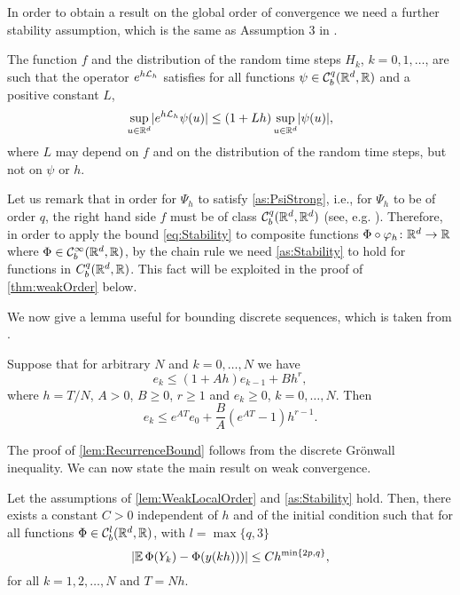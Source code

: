 \documentclass[10pt]{article}
\begin{document}
In order to obtain a result on the global order of convergence we need a further stability assumption, which is the same as Assumption 3 in \cite{CGS17}.
\begin{assumption}\label{as:Stability} The function $f$ and the distribution of the random time steps $H_k$, $k = 0, 1, \ldots$, are such that the operator $e^{h\mathcal{L}_h}$ satisfies for all functions $\psi\in \mathcal C^q_b(\mathbb{R}^d, \mathbb{R})$ and a positive constant $L$, 
	\begin{equation}\label{eq:Stability}
		\sup_{u\in\mathbb{R}^d} \lvert e^{h\mathcal{L}_h}\psi(u)\rvert \leq (1 + Lh)\sup_{u\in\mathbb{R}^d}\lvert\psi(u)\rvert,
	\end{equation}
	where $L$ may depend on $f$ and on the distribution of the random time steps, but not on $\psi$ or $h$.
\end{assumption}
\begin{remark} Let us remark that in order for $\Psi_h$ to satisfy \cref{as:PsiStrong}, i.e., for $\Psi_h$ to be of order $q$, the right hand side $f$ must be of class $\mathcal C_b^q(\mathbb{R}^d, \mathbb{R}^d)$ (see, e.g. \cite[Theorem II.3.1]{HNW93}). Therefore, in order to apply the bound \eqref{eq:Stability} to composite functions $\Phi \circ \varphi_h \colon \mathbb{R}^d \to \mathbb{R}$ where $\Phi \in \mathcal C^\infty_b(\mathbb{R}^d, \mathbb{R})$, by the chain rule we need \cref{as:Stability} to hold for functions in $C^q_b(\mathbb{R}^d, \mathbb{R})$. This fact will be exploited in the proof of \cref{thm:weakOrder} below.
\end{remark}
We now give a lemma useful for bounding discrete sequences, which is taken from \cite[Lemma 1.6]{MiT04}.
\begin{lemma}\label{lem:RecurrenceBound} Suppose that for arbitrary $N$ and $k = 0, \ldots, N$ we have
		\begin{equation}
		e_k \leq (1 + Ah) e_{k-1} + Bh^r,
		\end{equation}
		where $h = T / N$, $A > 0$, $B \geq 0$, $r \geq 1$ and $e_k \geq 0$, $k = 0, \ldots, N$. Then
		\begin{equation}
		e_k \leq e^{AT}e_0 + \frac{B}{A}(e^{AT} - 1) h^{r-1}.
		\end{equation}
\end{lemma}

The proof of \cref{lem:RecurrenceBound} follows from the discrete Grönwall inequality. We can now state the main result on weak convergence. 

\begin{theorem}\label{thm:weakOrder} Let the assumptions of \cref{lem:WeakLocalOrder} and \cref{as:Stability} hold. Then, there exists a constant $C > 0$ independent of $h$ and of the initial condition such that for all functions $\Phi \in \mathcal C_b^l(\mathbb{R}^d,\mathbb{R})$, with $l = \max\{q, 3\}$
	\begin{equation}\label{eq:weakOrder}
		\lvert\operatorname{\mathbb{E}}\Phi(Y_k) - \Phi(y(kh)))\rvert \leq Ch^{\min\{2p, q\}},
	\end{equation}
	for all $k = 1, 2, \ldots, N$ and $T = Nh$.
\end{theorem}
	
\end{document}
